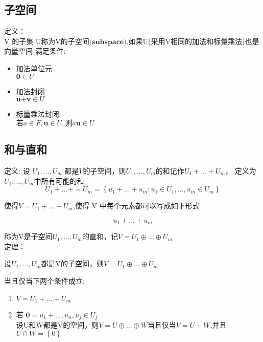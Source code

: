 \subsection{子空间}
定义：\\
V 的子集 U称为V的$\textbf{子空间(subspace)}$,如果U(采用V相同的加法和标量乘法)也是向量空间
满足条件:
\begin{itemize}
    \item 加法单位元\\
$\textbf{0}\in U$
    \item 加法封闭\\
$\textbf{u+v}\in U$
    \item 标量乘法封闭\\
$若a\in F,\textbf{u}\in U,则 a\textbf{u}\in U$
\end{itemize}

\subsection{和与直和}
定义:
设 $U_{1},...,U_{m}$ 都是$V$的子空间，则$U_{1},...,U_{m}$的和记作$U_{1}+...+U_{m}$，
定义为$U_{1},...,U_{m}$中所有可能的和\\
\begin{equation}
    U_{1}+...+=U_{m}=\left\{u_{1}+...+u_{m}:u_{1}\in U_{1},... ,u_{m}\in U_{m}\right\}
\end{equation}
\par 使得$V=U_{1}+...+U_{m}$,使得 V 中每个元素都可以写成如下形式

$$
u_{1}+...+u_{m}
$$

称为V是子空间$U_{1},...,U_{m}$的直和，记$V=U_{1}\oplus...\oplus U_{m}$\\
定理：\\
\begin{center}
    设$U_{1},...,U_{m}$都是V的子空间，则$V=U_{1}\oplus...\oplus U_{m}$
\end{center}
当且仅当下两个条件成立:
\begin{enumerate}
    \item $V=U_{1}+...+ U_{m}$
    \item 若 $\textbf{0}=u_{1}+...,u_{n},u_{j}\in U_{j}$\\
设U和W都是V的空间，则$V=U\oplus...\oplus W $当且仅当$V=U+W$,并且$U\cap W=\left\{ 0\right\}$
\end{enumerate}